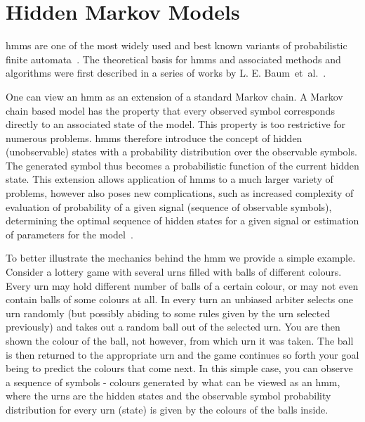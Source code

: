 \section{Hidden Markov Models}
\label{sec:hmm}
\glspl{hmm} are one of the most widely used and best known variants of probabilistic finite automata~\cite{pautomacTR, Rabiner89hmm}. The theoretical basis for \glspl{hmm} and associated methods and algorithms were first described in a series of works by L. E. Baum~et~al.~\cite{baum1966, baum1967, baum1968, baum1970, baum1972}.

One can view an \gls{hmm} as an extension of a standard Markov chain. A Markov chain based model has the property that every observed symbol corresponds directly to an associated state of the model. This property is too restrictive for numerous problems. \glspl{hmm} therefore introduce the concept of hidden (unobservable) states with a probability distribution over the observable symbols. The generated symbol thus becomes a probabilistic function of the current hidden state. This extension allows application of \glspl{hmm} to a much larger variety of problems, however also poses new complications, such as increased complexity of evaluation of probability of a given signal (sequence of observable symbols), determining the optimal sequence of hidden states for a given signal or estimation of parameters for the model~\cite{Rabiner89hmm}.

To better illustrate the mechanics behind the \gls{hmm} we provide a simple example. Consider a lottery game with several urns filled with balls of different colours. Every urn may hold different number of balls of a certain colour, or may not even contain balls of some colours at all. In every turn an unbiased arbiter selects one urn randomly (but possibly abiding to some rules given by the urn selected previously) and takes out a random ball out of the selected urn. You are then shown the colour of the ball, not however, from which urn it was taken. The ball is then returned to the appropriate urn and the game continues so forth your goal being to predict the colours that come next. In this simple case, you can observe a sequence of symbols - colours generated by what can be viewed as an \gls{hmm}, where the urns are the hidden states and the observable symbol probability distribution for every urn (state) is given by the colours of the balls inside.

